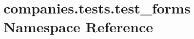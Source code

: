 \hypertarget{namespacecompanies_1_1tests_1_1test__forms}{\section{companies.\-tests.\-test\-\_\-forms Namespace Reference}
\label{namespacecompanies_1_1tests_1_1test__forms}
}
